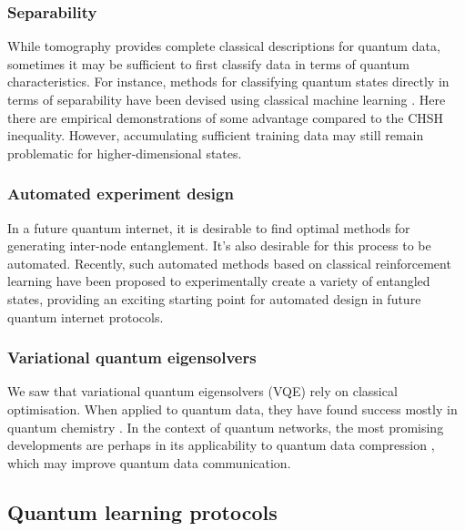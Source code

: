 \documentclass[twocolumn, aps, rmp, amsmath, amssymb, nofootinbib, superscriptaddress, longbibliography, floatfix, table-of-contents, eqsecnum]{revtex4}
\begin{document}
\subsubsection{Separability}

While tomography provides complete classical descriptions for quantum data, sometimes it may be sufficient to first classify data in terms of quantum characteristics. For instance, methods for classifying quantum states directly in terms of separability have been devised using classical machine learning \cite{bib:Ma2017, bib:Su2017, bib:Gao2018}. Here there are empirical demonstrations of some advantage compared to the CHSH inequality. However, accumulating sufficient training data may still remain problematic for higher-dimensional states.

\subsubsection{Automated experiment design}

In a future quantum internet, it is desirable to find optimal methods for generating inter-node entanglement. It's also desirable for this process to be automated. Recently, such automated methods based on classical reinforcement learning \cite{bib:alexey} have been proposed to experimentally create a variety of entangled states, providing an exciting starting point for automated design in future quantum internet protocols.

\subsubsection{Variational quantum eigensolvers}

We saw that variational quantum eigensolvers (VQE) rely on classical optimisation. When applied to quantum data, they have found success mostly in quantum chemistry \cite{bib:peruzzo2014peruzzo, bib:moll2018quantum}. In the context of quantum networks, the most promising developments are perhaps in its applicability to quantum data compression \cite{bib:jonromero}, which may improve quantum data communication.

\subsection{Quantum learning protocols}
\end{document}

